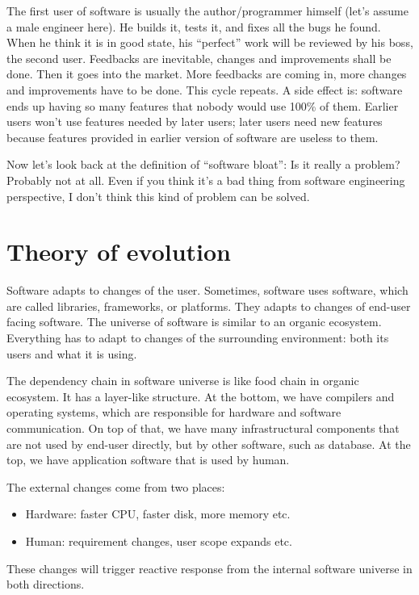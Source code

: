 \documentclass[a4paper, 11pt]{article}
\begin{document}
The first user of software is usually the author/programmer himself
(let's assume a male engineer here). He builds it, tests it, and fixes
all the bugs he found. When he think it is in good state, his
``perfect'' work will be reviewed by his boss, the second
user. Feedbacks are inevitable, changes and improvements shall be
done. Then it goes into the market. More feedbacks are coming in, more
changes and improvements have to be done. This cycle repeats. A side
effect is: software ends up having so many features that nobody would
use 100\% of them. Earlier users won't use features needed by later
users; later users need new features because features provided in
earlier version of software are useless to them.

Now let's look back at the definition of ``software bloat'': Is it
really a problem? Probably not at all. Even if you think it's a bad
thing from software engineering perspective, I don't think this kind
of problem can be solved.

\section*{Theory of evolution}

Software adapts to changes of the user. Sometimes, software uses
software, which are called libraries, frameworks, or platforms. They
adapts to changes of end-user facing software. The universe of
software is similar to an organic ecosystem. Everything has to adapt
to changes of the surrounding environment: both its users and what it
is using.

The dependency chain in software universe is like food chain in
organic ecosystem. It has a layer-like structure. At the bottom, we
have compilers and operating systems, which are responsible for
hardware and software communication. On top of that, we have many
infrastructural components that are not used by end-user directly, but
by other software, such as database. At the top, we have application
software that is used by human.

The external changes come from two places:
\begin{itemize}
\item Hardware: faster CPU, faster disk, more memory etc.
\item Human: requirement changes, user scope expands etc.
\end{itemize}
These changes will trigger reactive response from the internal
software universe in both directions.
\end{document}
